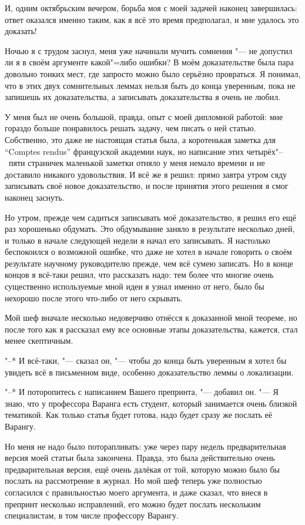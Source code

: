 И, одним октябрьским вечером, борьба моя с моей задачей наконец завершилась:
ответ оказался именно таким, как я всё это время предполагал, и мне удалось это
доказать!

Ночью я с трудом заснул, меня уже начинали мучить сомнения "--- не допустил ли
я в своём аргументе какой"=либо ошибки?
В моём доказательстве была пара довольно тонких мест, где запросто можно было
серьёзно провраться.
Я понимал, что в этих двух сомнительных леммах нельзя быть до конца уверенным,
пока не запишешь их доказательства, а записывать доказательства я очень не любил.

У меня был не очень большой, правда, опыт с моей дипломной работой:
мне гораздо больше понравилось решать задачу, чем писать о ней статью.
Собственно, это даже не настоящая статья была, а коротенькая заметка для
\enquote{\foreignlanguage{french}{Comptes rendus}}
французской академии наук, но написание этих четырёх"--~пяти страничек маленькой
заметки отняло у меня немало времени и не доставило никакого удовольствия.
И всё же я решил: прямо завтра утром сяду записывать своё новое доказательство,
и после принятия этого решения я смог наконец заснуть.

Но утром, прежде чем садиться записывать моё доказательство, я решил его ещё раз
хорошенько обдумать.
Это обдумывание заняло в результате несколько дней, и только в начале следующей
недели я начал его записывать.
Я настолько беспокоился о возможной ошибке, что даже не хотел в начале говорить
о своём результате научному руководителю прежде, чем всё сумею записать.
Но в конце концов я всё-таки решил, что рассказать надо:
тем более что многие очень существенно используемые мной идеи я узнал именно от
него, было бы нехорошо после этого что-либо от него скрывать.

Мой шеф вначале несколько недоверчиво отнёсся к доказанной мной теореме, но
после того как я рассказал ему все основные этапы доказательства, кажется, стал
менее скептичным.

"--* И всё-таки, "--- сказал он, "--- чтобы до конца быть уверенным я хотел
бы увидеть всё в письменном виде, особенно доказательство леммы о локализации.

"--* И поторопитесь с написанием Вашего препринта, "--- добавил он.
"--- Я знаю, что у профессора Варанга есть студент, который занимается очень
близкой тематикой.
Как только статья будет готова, надо будет сразу же послать её Варангу.

Но меня не надо было поторапливать:
уже через пару недель предварительная версия моей статьи была закончена.
Правда, это была действительно очень предварительная версия, ещё очень далёкая
от той, которую можно было бы послать на рассмотрение в журнал.
Но мой шеф теперь уже полностью согласился с правильностью моего аргумента, и
даже сказал, что внеся в препринт несколько исправлений, его можно будет послать
нескольким специалистам, в том числе профессору Варангу.

